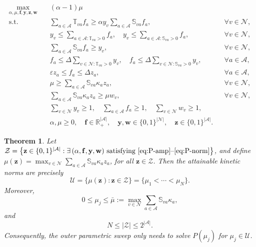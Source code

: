 \documentclass[10pt,a4paper]{amsart}
\newtheorem{theorem}{Theorem}
\begin{document}
\begin{align}
  \max_{\alpha,\mu,\mathbf f,\mathbf y,\mathbf z,\mathbf w}\quad
  &(\alpha-1)\mu
  \tag{P}\label{eq:problema_completo}\\
  \text{s.t.}\quad
  &\sum_{a\in\mathcal A}\mathbb{T}_{va}f_a
  \geq
  \alpha y_v\sum_{a\in\mathcal A}\mathbb{S}_{va}f_a,
  && \forall v\in\mathcal N,
  \label{eq:P-amp}\\[2pt]
  &y_v \leq
  \sum_{a\in\mathcal A:\mathbb{T}_{va}>0} f_a,\quad
  y_v \leq
  \sum_{a\in\mathcal A:\mathbb{S}_{va}>0} f_a,
  && \forall v\in\mathcal N,
  \label{eq:P-auto}\\[2pt]
  &\sum_{a\in\mathcal A}\mathbb{S}_{va}f_a \geq y_v,
  && \forall v\in\mathcal N,
  \label{eq:P-cons}\\[2pt]
  &f_a \leq
  \Delta\sum_{v\in\mathcal N:\mathbb{T}_{va}>0} y_v,\quad
  f_a \leq
  \Delta\sum_{v\in\mathcal N:\mathbb{S}_{va}>0} y_v,
  && \forall a\in\mathcal A,
  \label{eq:P-link}\\[2pt]
  &\varepsilon z_a \leq f_a \leq \Delta z_a,
  && \forall a\in\mathcal A,
  \label{eq:P-supp}\\[2pt]
  &\mu \geq
  \sum_{a\in\mathcal A}\mathbb{S}_{va}\kappa_a z_a,
  && \forall v\in\mathcal N,
  \label{eq:P-sup}\\[2pt]
  &\sum_{a\in\mathcal A}\mathbb{S}_{va}\kappa_a z_a
  \geq \mu w_v,
  && \forall v\in\mathcal N,
  \label{eq:P-inf}\\[2pt]
  &\sum_{v\in\mathcal N} y_v \geq 1,\quad
  \sum_{a\in\mathcal A} f_a \geq 1,\quad
  \sum_{v\in\mathcal N} w_v \geq 1,
  \label{eq:P-norm}\\[2pt]
  &\alpha,\mu\geq 0,\quad
  \mathbf f\in\mathbb R_+^{|\mathcal A|},\quad
  \mathbf y,\mathbf w\in\{0,1\}^{|\mathcal N|},\quad
  \mathbf z\in\{0,1\}^{|\mathcal A|}.
  \nonumber
\end{align}

\begin{theorem}
\label{thm:mu_values}
Let $\mathcal Z=
\left\{
\mathbf z\in\{0,1\}^{|\mathcal A|}:
\exists\,(\alpha,\mathbf f,\mathbf y,\mathbf w)
\text{ satisfying }
\eqref{eq:P-amp}\text{--}\eqref{eq:P-norm}
\right\}$, 
and define $
\mu(\mathbf z)=
\max_{v\in\mathcal N}
\sum_{a\in\mathcal A}
\mathbb S_{va}\kappa_a z_a$, for all
$\mathbf z\in\mathcal Z$. 
Then the attainable kinetic norms are precisely
$$
\mathcal U=
\{\mu(\mathbf z):\mathbf z\in\mathcal Z\}
=
\{\mu_1<\cdots<\mu_N\}.
$$
Moreover,
$$
0\le
\mu_j
\le
\bar\mu:=
\max_{v\in\mathcal N}
\sum_{a\in\mathcal A}
\mathbb S_{va}\kappa_a,
$$
and
$$
N\le |\mathcal Z|
\le
2^{|\mathcal A|}.
$$
Consequently, the outer parametric sweep only needs to solve
$P(\mu_j)$ for
$\mu_j\in\mathcal U$.
\end{theorem}
\end{document}
